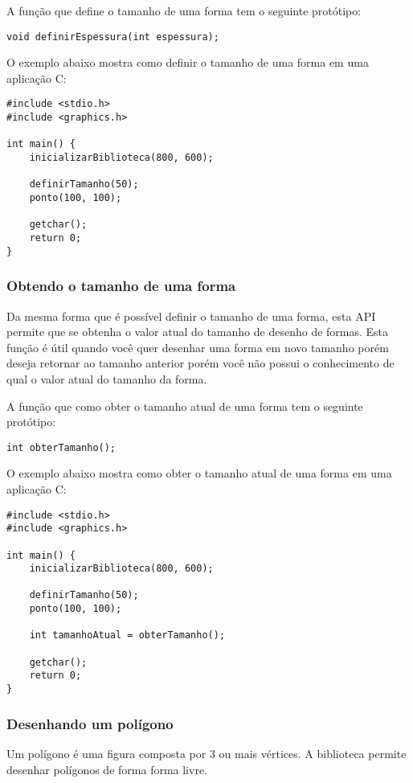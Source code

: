 \documentclass[12pt, %
openright,
oneside, %
a4paper,    %
brazil]{facom-ufu-abntex2}
\begin{document}
A função que define o tamanho de uma forma tem o seguinte protótipo:

\begin{lstlisting}
void definirEspessura(int espessura);
\end{lstlisting}

O exemplo abaixo mostra como definir o tamanho de uma forma em uma aplicação C:

\begin{lstlisting}
#include <stdio.h>
#include <graphics.h>

int main() {
    inicializarBiblioteca(800, 600);

    definirTamanho(50);
    ponto(100, 100);

    getchar();
    return 0;
}
\end{lstlisting}

\subsubsection{Obtendo o tamanho de uma forma}
Da mesma forma que é possível definir o tamanho de uma forma, esta API permite que se obtenha o valor atual do tamanho de desenho de formas. Esta função é útil quando você quer desenhar uma forma em novo tamanho porém deseja retornar ao tamanho anterior porém você não possui o conhecimento de qual o valor atual do tamanho da forma.

A função que como obter o tamanho atual de uma forma tem o seguinte protótipo:

\begin{lstlisting}
int obterTamanho();
\end{lstlisting}

O exemplo abaixo mostra como obter o tamanho atual de uma forma em uma aplicação C:

\begin{lstlisting}
#include <stdio.h>
#include <graphics.h>

int main() {
    inicializarBiblioteca(800, 600);

    definirTamanho(50);
    ponto(100, 100);

    int tamanhoAtual = obterTamanho();

    getchar();
    return 0;
}
\end{lstlisting}

\subsubsection{Desenhando um polígono}
Um polígono é uma figura composta por 3 ou mais vértices. A biblioteca permite desenhar polígonos de forma forma livre.
\end{document}
